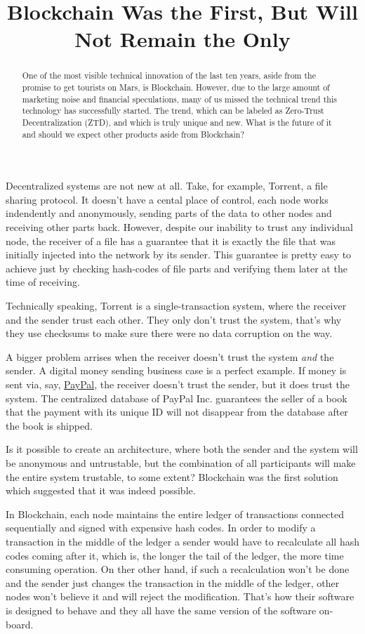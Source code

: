\documentclass{main}
\title{Blockchain Was the First, But Will Not Remain the Only}
\begin{document}
\begin{abstract}
One of the most visible technical innovation of the last ten years,
aside from the promise to get tourists on Mars, is Blockchain. However,
due to the large amount of marketing noise and financial speculations, many
of us missed the technical trend this technology has successfully started.
The trend, which can be labeled as Zero-Trust Decentralization (ZTD), and
which is truly unique and new. What is the future of it and should we
expect other products aside from Blockchain?
\end{abstract}

Decentralized systems are not new at all. Take, for example, Torrent, a file sharing
protocol. It doesn't have a cental place of control, each node
works indendently and anonymously, sending parts of the data to other nodes
and receiving other parts back.  However, despite our inability to trust
any individual node, the receiver of a file has a guarantee that it is
exactly the file that was initially injected into the network by its sender.
This guarantee is pretty easy to achieve just by checking hash-codes
of file parts and verifying them later at the time of receiving.

Technically speaking, Torrent is a single-transaction system, where the
receiver and the sender trust each other. They only don't trust the system,
that's why they use checksums to make sure there were no data corruption
on the way.

A bigger problem arrises when the receiver doesn't trust the system \emph{and}
the sender. A digital money sending business case is a perfect example. If money
is sent via, say, \href{https://www.paypal.com}{PayPal}, the receiver doesn't trust the sender, but it
does trust the system. The centralized database of PayPal Inc. guarantees
the seller of a book that the payment with its unique ID will
not disappear from the database after the book is shipped.

Is it possible to create an architecture, where both the sender and the system
will be anonymous and untrustable, but the combination of all participants will
make the entire system trustable, to some extent? Blockchain was the first
solution which suggested that it was indeed possible.

In Blockchain, each node maintains the entire ledger of transactions
connected sequentially and signed with expensive hash codes. In order to modify
a transaction in the middle of the ledger a sender would have to recalculate
all hash codes coming after it, which is, the longer the tail of the ledger,
the more time consuming operation. On ther other hand,
if such a recalculation won't be done and the sender just changes the
transaction in the middle of the ledger, other nodes won't believe it and
will reject the modification. That's how their software is designed to behave
and they all have the same version of the software on-board.
\end{document}
